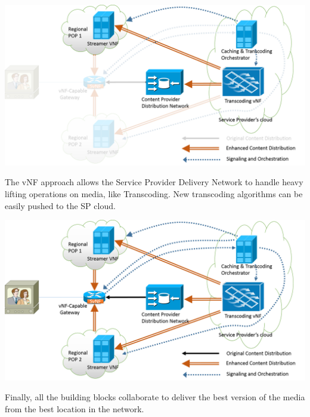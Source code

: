 \documentclass[a4paper]{beamer}
\begin{document}
\begin{frame}[plain,T]{}
	\centering
	\includegraphics[width=0.95\linewidth]{highleveldesign6.png}
	\vspace{1em}
	\begin{block}{}
		The vNF approach allows the Service Provider Delivery Network to handle heavy lifting operations on media, like Transcoding. New transcoding algorithms can be easily pushed to the SP cloud.
	\end{block}
\end{frame}


\begin{frame}[plain,T]{}
	\centering
	\includegraphics[width=0.95\linewidth]{highleveldesign7.png}
	\vspace{2em}
	\begin{block}{}
		Finally, all the building blocks collaborate to deliver the best version of the media from the best location in the network.
	\end{block}
\end{frame}
\end{document}
